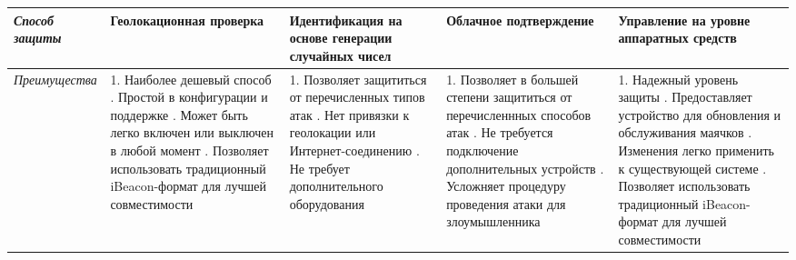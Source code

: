 \begin{sideways}
	\begin{tabu} to 
	\hline
	\textit{Способ защиты} & 
	    \textbf{Геолокационная проверка} & 
	    \textbf{Идентификация на основе генерации случайных чисел} &
	    \textbf{Облачное подтверждение} &
	    \textbf{Управление на уровне аппаратных средств} \\
	\hline
	
	\textit{Преимущества} & 
	    1. Наиболее дешевый способ . Простой в конфигурации и поддержке . Может быть легко включен или выключен в любой момент . Позволяет использовать традиционный iBeacon-формат для лучшей совместимости & 
	    
	    1. Позволяет защититься от перечисленных типов атак . Нет привязки к геолокации или Интернет-соединению . Не требует дополнительного оборудования &
	    
	    1. Позволяет в большей степени защититься от перечисленнных способов атак . Не требуется подключение дополнительных устройств . Усложняет процедуру проведения атаки для злоумышленника &
	    
	    1. Надежный уровень защиты . Предоставляет устройство для обновления и обслуживания маячков . Изменения легко применить к существующей системе . Позволяет использовать традиционный iBeacon-формат для лучшей совместимости \\
	\hline
	\end{tabu}
\end{sideways}

